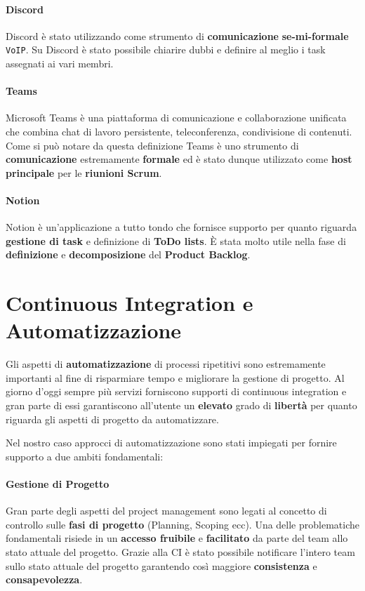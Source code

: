 \paragraph{Discord}
Discord è stato utilizzando come strumento di \textbf{comunicazione} \textbf{se-mi-formale} \texttt{VoIP}. Su Discord è stato possibile chiarire dubbi e definire al meglio i task assegnati ai vari membri.

\paragraph{Teams}
Microsoft Teams è una piattaforma di comunicazione e collaborazione unificata che combina chat di lavoro persistente, teleconferenza, condivisione di contenuti. Come si può notare da questa definizione Teams è uno strumento di \textbf{comunicazione} estremamente \textbf{formale} ed è stato dunque utilizzato come \textbf{host principale} per le \textbf{riunioni Scrum}.

\paragraph{Notion}
Notion è un'applicazione a tutto tondo che fornisce supporto per quanto riguarda \textbf{gestione di task} e definizione di \textbf{ToDo lists}. È stata molto utile nella fase di \textbf{definizione} e \textbf{decomposizione} del \textbf{Product Backlog}.

\section{Continuous Integration e Automatizzazione}
Gli aspetti di \textbf{automatizzazione} di processi ripetitivi sono estremamente importanti al fine di risparmiare tempo e migliorare la gestione di progetto. Al giorno d'oggi sempre più servizi forniscono supporti di continuous integration e gran parte di essi garantiscono all'utente un \textbf{elevato} grado di \textbf{libertà} per quanto riguarda gli aspetti di progetto da automatizzare.

Nel nostro caso approcci di automatizzazione sono stati impiegati per fornire supporto a due ambiti fondamentali:
\paragraph{Gestione di Progetto}
Gran parte degli aspetti del project management sono legati al concetto di controllo sulle \textbf{fasi di progetto} (Planning, Scoping ecc). Una delle problematiche fondamentali risiede in un \textbf{accesso fruibile} e \textbf{facilitato} da parte del team allo stato attuale del progetto. Grazie alla CI è stato possibile notificare l'intero team sullo stato attuale del progetto garantendo così maggiore \textbf{consistenza} e \textbf{consapevolezza}.

